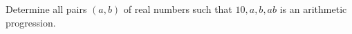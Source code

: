 Determine all pairs $ (a,b)$ of real numbers such that $ 10, a, b, ab$ is an arithmetic progression.